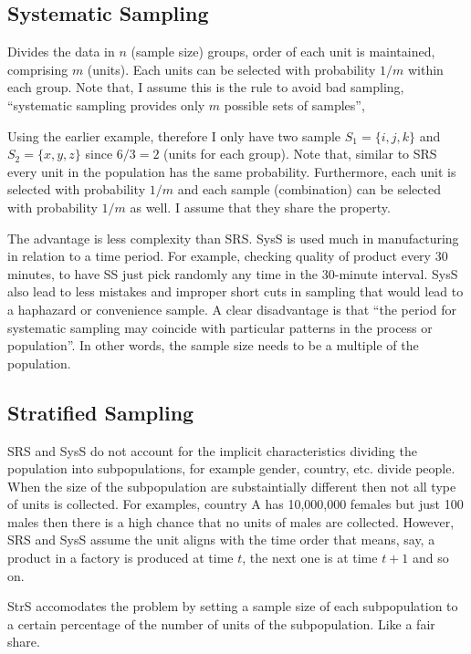 \subsection{Systematic Sampling}
\label{sec:SystematicSampling}
Divides the data in $n$ (sample size) groups, order of each unit is maintained, comprising $m$ (units). Each units can be selected with probability $1/m$ within each group. Note that, I assume this is the rule to avoid 
bad sampling, ``systematic sampling provides only $m$ possible sets of samples'', 

Using the earlier example, therefore I only have two sample $S_1=\{i,j,k\}$ and $S_2=\{x,y,z\}$ since $6/3=2$ (units for each group). 
Note that, similar to SRS every unit in the population has the same probability. Furthermore, each unit is selected with probability $1/m$ and each sample (combination) can be selected with probability $1/m$ as well. 
I assume that they share the property.

The advantage is less complexity than SRS. SysS is used much in manufacturing in relation to a time period. For example, checking quality of product every 30 minutes, to have SS just pick randomly any time in the 30-minute 
interval. SysS also lead to less mistakes and improper short cuts in sampling that would lead to a haphazard or convenience sample. A clear disadvantage is that ``the period for systematic sampling may coincide with 
particular patterns in the process or population''. In other words, the sample size needs to be a multiple of the population.   

\subsection{Stratified Sampling}
SRS and SysS do not account for the implicit characteristics dividing the population into subpopulations, for example gender, country, etc. divide people. When the size of the subpopulation are substaintially different
then not all type of units is collected. For examples, country A has 10,000,000 females but just 100 males then there is a high chance that no units of males are collected. However, SRS and SysS assume the 
unit aligns with the time order that means, say, a product in a factory is produced at time $t$, the next one is at time $t+1$ and so on. 

StrS accomodates the problem by setting a sample size of each subpopulation to a certain percentage of the number of units of the subpopulation. Like a fair share.


